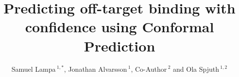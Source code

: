 \documentclass[utf8]{frontiersSCNS} %
\def\firstAuthorLast{Sample {et~al.}} %
\def\Authors{Samuel Lampa\,$^{1,*}$, Jonathan Alvarsson\,$^{1}$, Co-Author\,$^{2}$ and Ola Spjuth\,$^{1,2}$}
\begin{document}
\onecolumn
{}

\title[Predicting off-target binding with confidence using Conformal Prediction]{Predicting off-target binding with confidence using Conformal Prediction}

\author[\firstAuthorLast ]{\Authors} %
\address{} %
\correspondance{} %

\extraAuth{}%


\maketitle
\end{document}
